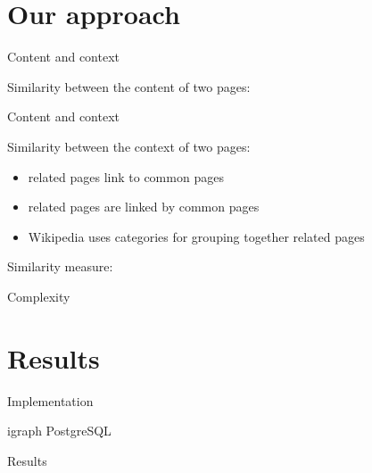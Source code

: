 \documentclass[xcolor=dvipsnames]{beamer}
\begin{document}
\section{Our approach}

\begin{frame}{Content and context}

Similarity between the content of two pages:




\end{frame}

\begin{frame}{Content and context}

Similarity between the context of two pages:

\begin{itemize}
\item related pages link to common pages 
\item related pages are linked by common pages
\item Wikipedia uses categories for grouping together related pages
\end{itemize}

\end{frame}

\begin{frame}{Similarity measure: }



\end{frame}

\begin{frame}{Complexity }



\end{frame}

\section{Results}
\begin{frame}{Implementation}

igraph  PostgreSQL
\end{frame}

\begin{frame}{Results}

\end{frame}
\end{document}
